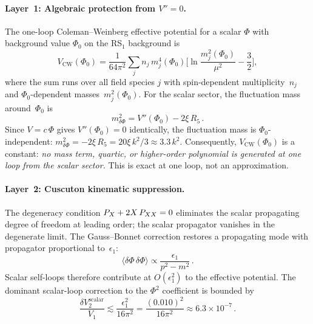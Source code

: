 \paragraph{Layer~1: Algebraic protection from $V'' = 0$.}
The one-loop Coleman--Weinberg effective potential for a scalar $\Phi$ with background value $\Phi_0$ on the RS$_1$ background is
\begin{equation}
  \label{eq:app-VCW}
  V_{\mathrm{CW}}(\Phi_0) = \frac{1}{64\pi^2}
  \sum_j n_j\, m_j^4(\Phi_0)
  \biggl[\ln\frac{m_j^2(\Phi_0)}{\mu^2} - \frac{3}{2}\biggr],
\end{equation}
where the sum runs over all field species $j$ with spin-dependent multiplicity~$n_j$ and $\Phi_0$-dependent masses~$m_j^2(\Phi_0)$. For the scalar sector, the fluctuation mass around~$\Phi_0$ is
\begin{equation}
  \label{eq:app-meff}
  m_{\delta\Phi}^2 = V''(\Phi_0) - 2\xi\, R_5\,.
\end{equation}
Since $V = c\,\Phi$ gives $V''(\Phi_0) = 0$ identically, the fluctuation mass is $\Phi_0$-independent: $m_{\delta\Phi}^2 = -2\xi\, R_5 = 20\xi\,k^2/3 \approx 3.3\,k^2$. Consequently, $V_{\mathrm{CW}}(\Phi_0)$ is a constant: \emph{no mass term, quartic, or higher-order polynomial is generated at one loop from the scalar sector.} This is exact at one loop, not an approximation.

\paragraph{Layer~2: Cuscuton kinematic suppression.}
The degeneracy condition $P_X + 2X\,P_{XX} = 0$ eliminates the scalar propagating degree of freedom at leading order; the scalar propagator vanishes in the degenerate limit. The Gauss--Bonnet correction restores a propagating mode with propagator proportional to~$\epsilon_1$:
\begin{equation}
  \label{eq:app-cusc-prop}
  \langle\delta\Phi\,\delta\Phi\rangle
  \propto \frac{\epsilon_1}{p^2 - m^2}\,.
\end{equation}
Scalar self-loops therefore contribute at $O(\epsilon_1^2)$ to the effective potential. The dominant scalar-loop correction to the $\Phi^2$ coefficient is bounded by
\begin{equation}
  \label{eq:app-scalar-bound}
  \frac{\delta V_2^{\mathrm{scalar}}}{V_1}
  \lesssim \frac{\epsilon_1^2}{16\pi^2}
  = \frac{(0.010)^2}{16\pi^2}
  \approx 6.3 \times 10^{-7}\,.
\end{equation}

